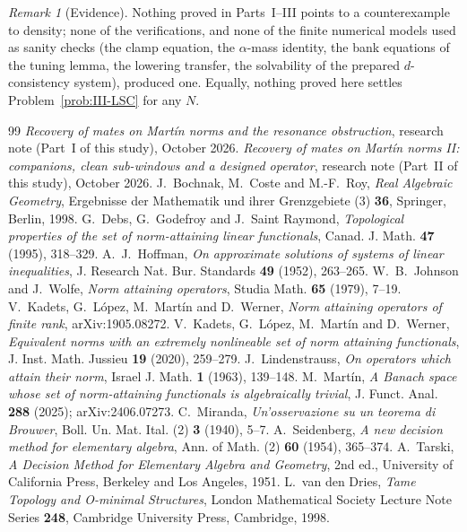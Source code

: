 \documentclass[10pt]{amsart}
\theoremstyle{definition}
\theoremstyle{remark}
\newtheorem{remark}[theorem]{Remark}
\begin{document}
\begin{remark}[Evidence]\label{rem:III-evidence}
Nothing proved in Parts~I--III points to a counterexample to density; none of
the verifications, and none of the finite numerical models used as sanity
checks (the clamp equation, the $\alpha$-mass identity, the bank equations
of the tuning lemma, the lowering transfer, the solvability of the prepared
$d$-consistency system), produced one.  Equally, nothing proved here settles
Problem~\ref{prob:III-LSC} for any $N$.
\end{remark}

\begin{thebibliography}{99}
\emph{Recovery of mates on Mart\'in norms and the resonance obstruction},
research note (Part~I of this study), October 2026.
\emph{Recovery of mates on Mart\'in norms II: companions, clean sub-windows
and a designed operator}, research note (Part~II of this study), October 2026.
J.~Bochnak, M.~Coste and M.-F.~Roy, \emph{Real Algebraic Geometry},
Ergebnisse der Mathematik und ihrer Grenzgebiete (3) \textbf{36},
Springer, Berlin, 1998.
G.~Debs, G.~Godefroy and J.~Saint Raymond,
\emph{Topological properties of the set of norm-attaining linear
functionals}, Canad. J. Math. \textbf{47} (1995), 318--329.
A.~J.~Hoffman, \emph{On approximate solutions of systems of linear
inequalities}, J. Research Nat. Bur. Standards \textbf{49} (1952),
263--265.
W.~B.~Johnson and J.~Wolfe, \emph{Norm attaining operators},
Studia Math. \textbf{65} (1979), 7--19.
V.~Kadets, G.~L\'opez, M.~Mart\'in and D.~Werner,
\emph{Norm attaining operators of finite rank}, arXiv:1905.08272.
V.~Kadets, G.~L\'opez, M.~Mart\'in and D.~Werner,
\emph{Equivalent norms with an extremely nonlineable set of norm attaining
functionals}, J. Inst. Math. Jussieu \textbf{19} (2020), 259--279.
J.~Lindenstrauss, \emph{On operators which attain their norm}, Israel J.
Math. \textbf{1} (1963), 139--148.
M.~Mart\'in,
\emph{A Banach space whose set of norm-attaining functionals is
algebraically trivial}, J. Funct. Anal. \textbf{288} (2025);
arXiv:2406.07273.
C.~Miranda, \emph{Un'osservazione su un teorema di Brouwer}, Boll. Un.
Mat. Ital. (2) \textbf{3} (1940), 5--7.
A.~Seidenberg, \emph{A new decision method for elementary algebra}, Ann.
of Math. (2) \textbf{60} (1954), 365--374.
A.~Tarski, \emph{A Decision Method for Elementary Algebra and Geometry},
2nd ed., University of California Press, Berkeley and Los Angeles, 1951.
L.~van den Dries, \emph{Tame Topology and O-minimal Structures}, London
Mathematical Society Lecture Note Series \textbf{248}, Cambridge University
Press, Cambridge, 1998.
\end{thebibliography}
\end{document}
